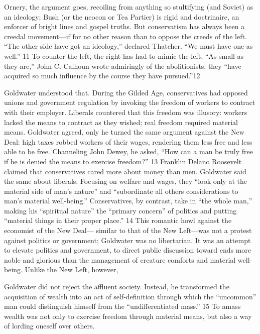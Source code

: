  \par 
Ornery, the argument goes, recoiling from anything so stultifying (and Soviet) as an ideology; Bush (or the neocon or Tea Partier) is rigid and doctrinaire, an enforcer of bright lines and gospel truths. But conservatism has always been a creedal movement—if for no other reason than to oppose the creeds of the left. “The other side have got an ideology,” declared Thatcher. “We must have one as well.” {\color{blue}11} To counter the left, the right has had to mimic the left. “As small as they are,” John C. Calhoun wrote admiringly of the abolitionists, they “have acquired so much influence by the course they have pursued.”{\color{blue}12}
 \par 
Goldwater understood that. During the Gilded Age, conservatives had opposed unions and government regulation by invoking the freedom of workers to contract with their employer. Liberals countered that this freedom was illusory: workers lacked the means to contract as they wished; real freedom required material means. Goldwater agreed, only he turned the same argument against the New Deal: high taxes robbed workers of their wages, rendering them less free and less able to be free. Channeling John Dewey, he asked, “How can a man be truly free if he is denied the means to exercise freedom?” {\color{blue}13} Franklin Delano Roosevelt claimed that conservatives cared more about money than men. Goldwater said the same about liberals. Focusing on welfare and wages, they “look only at the material side of man’s nature” and “subordinate all others considerations to man’s material well-being.” Conservatives, by contrast, take in “the whole man,” making his “spiritual nature” the “primary concern” of politics and putting “material things in their proper place.” {\color{blue}14} This romantic howl against the economist of the New Deal— similar to that of the New Left—was not a protest against politics or government; Goldwater was no libertarian. It was an attempt to elevate politics and government, to direct public discussion toward ends more noble and glorious than the management of creature comforts and material well-being. Unlike the New Left, however,
 \par 
Goldwater did not reject the affluent society. Instead, he transformed the acquisition of wealth into an act of self-definition through which the “uncommon” man could distinguish himself from the “undifferentiated mass.” {\color{blue}15} To amass wealth was not only to exercise freedom through material means, but also a way of lording oneself over others.
